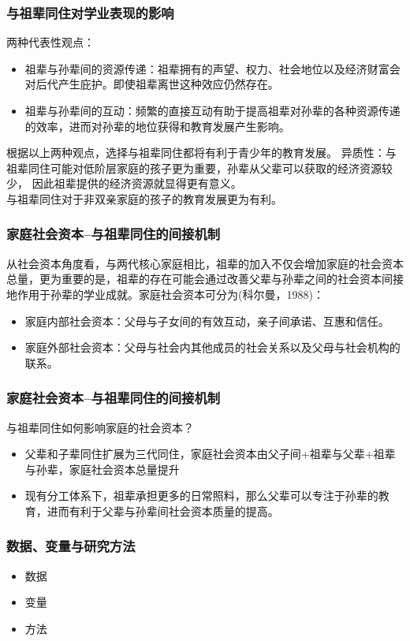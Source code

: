 \documentclass{beamer}
\begin{document}
\begin{frame}
	\frametitle{与祖辈同住对学业表现的影响}
两种代表性观点：
	\begin{itemize}
		\item 祖辈与孙辈间的资源传递：祖辈拥有的声望、权力、社会地位以及经济财富会对后代产生庇护。即使祖辈离世这种效应仍然存在。
		\item 祖辈与孙辈间的互动：频繁的直接互动有助于提高祖辈对孙辈的各种资源传递的效率，进而对孙辈的地位获得和教育发展产生影响。
	\end{itemize}
根据以上两种观点，选择与祖辈同住都将有利于青少年的教育发展。
	异质性：与祖辈同住可能对低阶层家庭的孩子更为重要，孙辈从父辈可以获取的经济资源较少， 因此祖辈提供的经济资源就显得更有意义。
	\\ 与祖辈同住对于非双亲家庭的孩子的教育发展更为有利。
\end{frame}

\begin{frame}
	\frametitle{家庭社会资本--与祖辈同住的间接机制}
	从社会资本角度看，与两代核心家庭相比，祖辈的加入不仅会增加家庭的社会资本总量，更为重要的是，祖辈的存在可能会通过改善父辈与孙辈之间的社会资本间接地作用于孙辈的学业成就。家庭社会资本可分为(科尔曼，1988)：
	\begin{itemize}
		\item 家庭内部社会资本：父母与子女间的有效互动，亲子间承诺、互惠和信任。
		\item 家庭外部社会资本：父母与社会内其他成员的社会关系以及父母与社会机构的联系。
	\end{itemize}
\end{frame}


\begin{frame}
	\frametitle{家庭社会资本--与祖辈同住的间接机制}
与祖辈同住如何影响家庭的社会资本？
\begin{itemize}
	\item 父辈和子辈同住扩展为三代同住，家庭社会资本由父子间+祖辈与父辈+祖辈与孙辈，家庭社会资本总量提升
	\item 现有分工体系下，祖辈承担更多的日常照料，那么父辈可以专注于孙辈的教育，进而有利于父辈与孙辈间社会资本质量的提高。
\end{itemize}
\end{frame}



\begin{frame}
	\frametitle{数据、变量与研究方法}
	\begin{itemize}
		\item 数据
		\item 变量
		\item 方法
	\end{itemize}
\end{frame}
\end{document}
